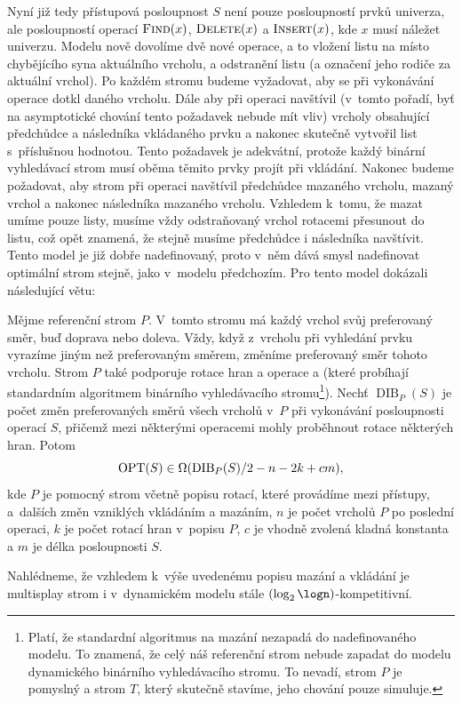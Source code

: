 Nyní již tedy přístupová posloupnost $S$ není pouze posloupností prvků
univerza, ale posloupností operací $\ope{Find}(x)$, $\ope{Delete}(x)$ a
$\ope{Insert}(x)$, kde $x$ musí náležet univerzu. Modelu nově dovolíme dvě
nové operace, a to vložení listu na místo chybějícího syna aktuálního vrcholu,
a odstranění listu (a označení jeho rodiče za aktuální vrchol). Po každém
stromu budeme vyžadovat, aby se při vykonávání operace  dotkl daného
vrcholu. Dále aby při operaci  navštívil (v~tomto pořadí, byť na
asymptotické chování tento požadavek nebude mít vliv) vrcholy obsahující
předchůdce a následníka vkládaného prvku a nakonec skutečně vytvořil list
s~příslušnou hodnotou. Tento požadavek je adekvátní, protože každý binární
vyhledávací strom musí oběma těmito prvky projít při vkládání. Nakonec budeme
požadovat, aby strom při operaci  navštívil předchůdce mazaného
vrcholu, mazaný vrchol a nakonec následníka mazaného vrcholu. Vzhledem k~tomu,
že mazat umíme pouze listy, musíme vždy odstraňovaný vrchol rotacemi přesunout
do listu, což opět znamená, že stejně musíme předchůdce i následníka navštívit.
Tento model je již dobře nadefinovaný, proto v~něm dává smysl nadefinovat optimální strom stejně, jako v~modelu předchozím.
Pro tento model \citet{multisplay} dokázali následující větu:

\begin{veta}
\def\dib{\operatorname{DIB}}
Mějme referenční strom $P$. V~tomto stromu má každý vrchol svůj preferovaný
směr, buď doprava nebo doleva. Vždy, když z~vrcholu při vyhledání prvku vyrazíme
jiným než preferovaným směrem, změníme preferovaný směr tohoto vrcholu. Strom
$P$ také podporuje rotace hran a operace  a  (které
probíhají standardním algoritmem binárního vyhledávacího stromu\footnote{Platí,
že standardní algoritmus na mazání nezapadá do nadefinovaného modelu. To
znamená, že celý náš referenční strom nebude zapadat do modelu dynamického
binárního vyhledávacího stromu. To nevadí, strom $P$ je pomyslný a strom
$T$, který skutečně stavíme, jeho chování pouze simuluje.}). Nechť $\dib_P(S)$ je
počet změn preferovaných směrů všech vrcholů v~$P$ při vykonávání posloupnosti
operací $S$, přičemž mezi některými operacemi mohly proběhnout rotace některých
hran. Potom $$\opt(S) \in \Omega(\dib_P(S)/2 - n - 2k + cm),$$ kde $P$ je
pomocný strom včetně popisu rotací, které provádíme mezi přístupy, a~dalších
změn vzniklých vkládáním a mazáním, $n$ je počet vrcholů $P$ po poslední operaci, $k$
je počet rotací hran v~popisu $P$, $c$ je vhodně zvolená kladná konstanta a $m$
je délka posloupnosti $S$.  \end{veta}

Nahlédneme, že vzhledem k~výše uvedenému popisu mazání a vkládání je multisplay strom i v~dynamickém modelu stále $(\log\logn)$-kompetitivní. 

